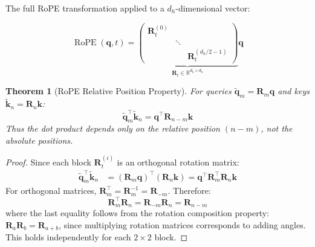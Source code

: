 \documentclass[12pt,a4paper]{article}
\newtheorem{theorem}{Theorem}[section]
\DeclareMathOperator{\RoPE}{RoPE}
\begin{document}
The full RoPE transformation applied to a $d_h$-dimensional vector:

\begin{eqbox}
\begin{equation}
\RoPE(\bm{q}, t) = \underbrace{\begin{pmatrix} \bm{R}_t^{(0)} & & \\ & \ddots & \\ & & \bm{R}_t^{(d_h/2-1)} \end{pmatrix}}_{\displaystyle \bm{R}_t \in \mathbb{R}^{d_h \times d_h}} \bm{q}
\label{eq:rope_full}
\end{equation}
\end{eqbox}

\begin{theorem}[RoPE Relative Position Property]
\label{thm:rope}
For queries $\tilde{\bm{q}}_m = \bm{R}_m \bm{q}$ and keys $\tilde{\bm{k}}_n = \bm{R}_n \bm{k}$:
\begin{equation}
\tilde{\bm{q}}_m^\top \tilde{\bm{k}}_n = \bm{q}^\top \bm{R}_{n-m} \bm{k}
\label{eq:rope_relative}
\end{equation}
Thus the dot product depends only on the relative position $(n - m)$, not the absolute positions.
\end{theorem}

\begin{proof}
Since each block $\bm{R}_t^{(i)}$ is an orthogonal rotation matrix:
\begin{align}
\tilde{\bm{q}}_m^\top \tilde{\bm{k}}_n &= (\bm{R}_m \bm{q})^\top (\bm{R}_n \bm{k}) = \bm{q}^\top \bm{R}_m^\top \bm{R}_n \bm{k}
\end{align}
For orthogonal matrices, $\bm{R}_m^\top = \bm{R}_m^{-1} = \bm{R}_{-m}$. Therefore:
\begin{equation}
\bm{R}_m^\top \bm{R}_n = \bm{R}_{-m} \bm{R}_n = \bm{R}_{n-m}
\end{equation}
where the last equality follows from the rotation composition property: $\bm{R}_a \bm{R}_b = \bm{R}_{a+b}$, since multiplying rotation matrices corresponds to adding angles. This holds independently for each $2\times2$ block.
\end{proof}
\end{document}
